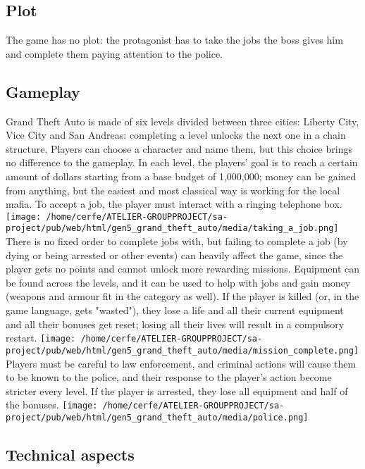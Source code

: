 \documentclass[a4paper,10pt]{book}
\begin{document}
 \subsection{Plot }
 
          The game has no plot: the protagonist has to take the jobs the boss gives him and complete them paying attention to the police.
         
 \subsection{Gameplay }
 
          Grand Theft Auto is made of six levels divided between three cities: Liberty City, Vice City and San Andreas: completing a level unlocks the next one in a chain structure.
          Players can choose a character and name them, but this choice brings no difference to the gameplay. 
          In each level, the players' goal is to reach a certain amount of dollars starting from a base budget of 1,000,000; money can be gained from anything, but the easiest and most classical way is working for the local mafia. To accept a job, the player must interact with a ringing telephone box. 
 \texttt{[image: /home/cerfe/ATELIER-GROUPPROJECT/sa-project/pub/web/html/gen5\_grand\_theft\_auto/media/taking\_a\_job.png]}
          There is no fixed order to complete jobs with, but failing to complete a job (by dying or being arrested or other events) can heavily affect the game, since the player gets no points and cannot unlock more rewarding missions.  Equipment can be found across the levels, and it can be used to help with jobs and gain money (weapons and armour fit in the category as well). If the player is killed (or, in the game language, gets "wasted"), they lose a life and all their current equipment and all their bonuses get reset; losing all their lives will result in a compulsory restart. 
 \texttt{[image: /home/cerfe/ATELIER-GROUPPROJECT/sa-project/pub/web/html/gen5\_grand\_theft\_auto/media/mission\_complete.png]}
 Players must be careful to law enforcement, and criminal actions will cause them to be known to the police, and their response to the player's action become stricter every level. If the player is arrested, they lose all equipment and half of the bonuses. 
 \texttt{[image: /home/cerfe/ATELIER-GROUPPROJECT/sa-project/pub/web/html/gen5\_grand\_theft\_auto/media/police.png]}
 
 \subsection{Technical aspects }
 
\end{document}
